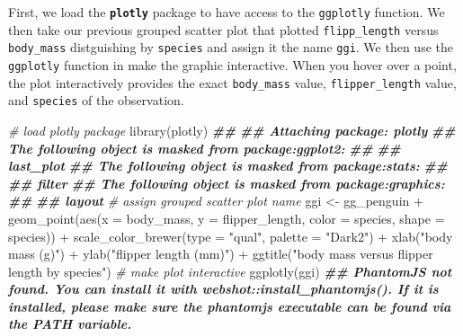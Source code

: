 \documentclass[
]{book}
\newenvironment{Shaded}{\begin{snugshade}}{\end{snugshade}}
\newcommand{\AttributeTok}[1]{\textcolor[rgb]{0.77,0.63,0.00}{#1}}
\newcommand{\CommentTok}[1]{\textcolor[rgb]{0.56,0.35,0.01}{\textit{#1}}}
\newcommand{\DocumentationTok}[1]{\textcolor[rgb]{0.56,0.35,0.01}{\textbf{\textit{#1}}}}
\newcommand{\FunctionTok}[1]{\textcolor[rgb]{0.00,0.00,0.00}{#1}}
\newcommand{\NormalTok}[1]{#1}
\newcommand{\OtherTok}[1]{\textcolor[rgb]{0.56,0.35,0.01}{#1}}
\newcommand{\SpecialCharTok}[1]{\textcolor[rgb]{0.00,0.00,0.00}{#1}}
\newcommand{\StringTok}[1]{\textcolor[rgb]{0.31,0.60,0.02}{#1}}
\theoremstyle{definition}
\theoremstyle{definition}
\theoremstyle{definition}
\theoremstyle{definition}
\theoremstyle{remark}
\begin{document}
First, we load the \textbf{\texttt{plotly}} package to have access to the \texttt{ggplotly} function. We then take our previous grouped scatter plot that plotted \texttt{flipp\_length} versus \texttt{body\_mass} distguishing by \texttt{species} and assign it the name \texttt{ggi}. We then use the \texttt{ggplotly} function in make the graphic interactive. When you hover over a point, the plot interactively provides the exact \texttt{body\_mass} value, \texttt{flipper\_length} value, and \texttt{species} of the observation.

\begin{Shaded}
\begin{Highlighting}[]
\CommentTok{\# load plotly package}
\FunctionTok{library}\NormalTok{(plotly)}
\DocumentationTok{\#\# }
\DocumentationTok{\#\# Attaching package: \textquotesingle{}plotly\textquotesingle{}}
\DocumentationTok{\#\# The following object is masked from \textquotesingle{}package:ggplot2\textquotesingle{}:}
\DocumentationTok{\#\# }
\DocumentationTok{\#\#     last\_plot}
\DocumentationTok{\#\# The following object is masked from \textquotesingle{}package:stats\textquotesingle{}:}
\DocumentationTok{\#\# }
\DocumentationTok{\#\#     filter}
\DocumentationTok{\#\# The following object is masked from \textquotesingle{}package:graphics\textquotesingle{}:}
\DocumentationTok{\#\# }
\DocumentationTok{\#\#     layout}
\CommentTok{\# assign grouped scatter plot name}
\NormalTok{ggi }\OtherTok{\textless{}{-}}
\NormalTok{  gg\_penguin }\SpecialCharTok{+}
  \FunctionTok{geom\_point}\NormalTok{(}\FunctionTok{aes}\NormalTok{(}\AttributeTok{x =}\NormalTok{ body\_mass, }\AttributeTok{y =}\NormalTok{ flipper\_length,}
                 \AttributeTok{color =}\NormalTok{ species, }\AttributeTok{shape =}\NormalTok{ species)) }\SpecialCharTok{+}
  \FunctionTok{scale\_color\_brewer}\NormalTok{(}\AttributeTok{type =} \StringTok{"qual"}\NormalTok{, }\AttributeTok{palette =} \StringTok{"Dark2"}\NormalTok{) }\SpecialCharTok{+}
  \FunctionTok{xlab}\NormalTok{(}\StringTok{"body mass (g)"}\NormalTok{) }\SpecialCharTok{+} \FunctionTok{ylab}\NormalTok{(}\StringTok{"flipper length (mm)"}\NormalTok{) }\SpecialCharTok{+}
  \FunctionTok{ggtitle}\NormalTok{(}\StringTok{"body mass versus flipper length by species"}\NormalTok{)}
\CommentTok{\# make plot interactive}
\FunctionTok{ggplotly}\NormalTok{(ggi)}
\DocumentationTok{\#\# PhantomJS not found. You can install it with webshot::install\_phantomjs(). If it is installed, please make sure the phantomjs executable can be found via the PATH variable.}
\end{Highlighting}
\end{Shaded}
\end{document}
